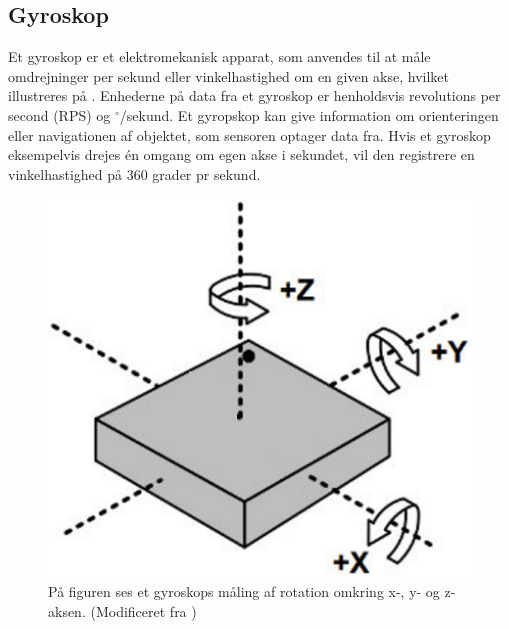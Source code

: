 \subsection{Gyroskop}
Et gyroskop er et elektromekanisk apparat, som anvendes til at måle omdrejninger per sekund eller vinkelhastighed om en given akse, hvilket illustreres på . Enhederne på data fra et gyroskop er henholdsvis revolutions per second (RPS) og $^\circ$/sekund. \newline
Et gyropskop kan give information om orienteringen eller navigationen af objektet, som sensoren optager data fra. Hvis et gyroskop eksempelvis drejes én omgang om egen akse i sekundet, vil den registrere en vinkelhastighed på 360 grader pr sekund. \citep{Sparkfun_gyro,Barbour2014}
\begin{figure}[H]
	\centering
	\includegraphics[scale=0.8]{figures/bProblemloesning/gyro.png}
	\caption{På figuren ses et gyroskops måling af rotation omkring x-, y- og z-aksen. (Modificeret fra \citep{Sparkfun_gyro})}
	\label{fig:gyro}
\end{figure}

